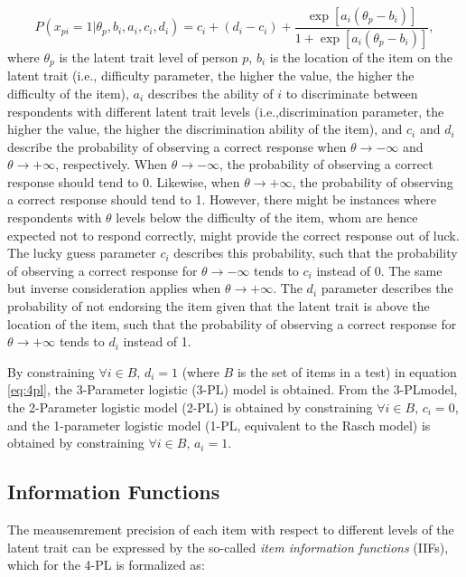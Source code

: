 \documentclass{svproc}
\begin{document}
\begin{equation}[eq:4pl]
	P(x_{pi}= 1| \theta_p, b_i, a_i, c_i, d_i) = c_i + (d_i -c_i) + \dfrac{\exp[a_i(\theta_p - b_i)]}{1 + \exp[a_i(\theta_p - b_i)]},
\end{equation}
where $\theta_p$ is the latent trait level of person $p$, $b_i$ is the location of the item on the latent trait (i.e., difficulty parameter, the higher the value, the higher the difficulty of the item), $a_i$ describes the ability of $i$ to discriminate between respondents with different latent trait levels (i.e.,discrimination parameter, the higher the value, the higher the discrimination ability of the item), and $c_i$ and $d_i$ describe the probability of observing a correct response when $\theta \to - \infty$ and $\theta \to +\infty$, respectively. 
When $\theta \to - \infty$, the probability of observing a correct response should tend to 0. Likewise, when $\theta \rightarrow +\infty$, the probability of observing a correct response should tend to 1. 
However, there might be instances where respondents with $\theta$ levels below the difficulty of the item, whom are hence expected not to respond correctly, might provide the correct response out of luck. The lucky guess parameter $c_i$ describes this probability, such that the probability of observing a correct response for $\theta \to - \infty$ tends to $c_i$ instead of 0. 
The same but inverse consideration applies when $\theta \to + \infty$. The $d_i$ parameter describes the probability of not endorsing the item given that the latent trait is above the location of the item, such that the probability of observing a correct response for $\theta \to + \infty$ tends to $d_i$ instead of 1. 

By constraining $\forall i \in B, \, d_i = 1$ (where $B$ is the set of items in a test) in equation \ref{eq:4pl}, the 3-Parameter logistic (3-PL) model is obtained. From the 3-PLmodel, the 2-Parameter logistic model (2-PL) is obtained by constraining $\forall i \in B, \, c_i = 0$, and the 1-parameter logistic model (1-PL, equivalent to the Rasch model) is obtained by constraining $\forall i \in B, \, a_i = 1$. 

\subsection{Information Functions}

The meausemrement precision of each item with respect to different levels of the latent trait can be expressed by the so-called \emph{item information functions} (IIFs), which for the 4-PL is formalized as: 
\end{document}
